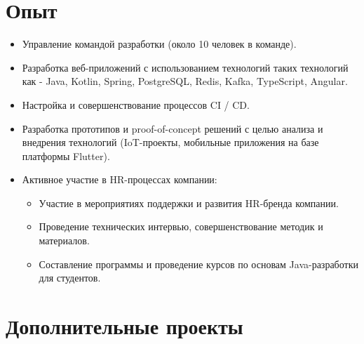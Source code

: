 \documentclass[11pt,a4paper,sans]{moderncv}        %
\begin{document}
\section{Опыт}
{
\begin{itemize}
\item Управление командой разработки (около 10 человек в команде).
\item Разработка веб-приложений с использованием технологий таких технологий как - Java, Kotlin, Spring, PostgreSQL, Redis, Kafka, TypeScript, Angular.
\item Настройка и совершенствование процессов CI / CD.
\item Разработка прототипов и proof-of-concept решений с целью анализа и внедрения технологий (IoT-проекты, мобильные приложения на базе платформы Flutter).
\item Активное участие в HR-процессах компании:
  \begin{itemize}
    \item Участие в мероприятиях поддержки и развития HR-бренда компании.
    \item Проведение технических интервью, совершенствование методик и материалов.
    \item Составление программы и проведение курсов по основам Java-разработки для студентов.
  \end{itemize}
\end{itemize}}



\section{Дополнительные проекты}
\end{document}
